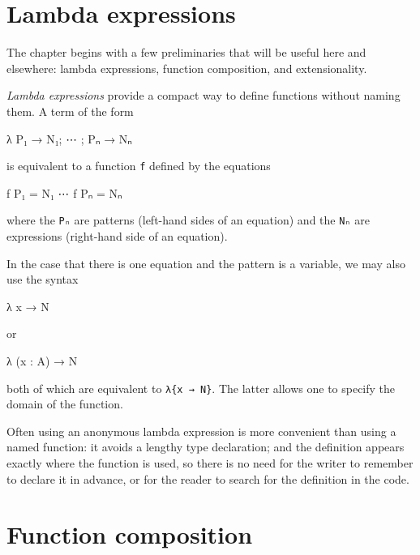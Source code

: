 \hypertarget{lambda-expressions}{%
\section{Lambda expressions}\label{lambda-expressions}}

The chapter begins with a few preliminaries that will be useful here and
elsewhere: lambda expressions, function composition, and extensionality.

\emph{Lambda expressions} provide a compact way to define functions
without naming them. A term of the form

\begin{myDisplay}
λ{ P₁ → N₁; ⋯ ; Pₙ → Nₙ }
\end{myDisplay}

is equivalent to a function \texttt{f} defined by the equations

\begin{myDisplay}
f P₁ = N₁
⋯
f Pₙ = Nₙ
\end{myDisplay}

where the \texttt{Pₙ} are patterns (left-hand sides of an equation) and
the \texttt{Nₙ} are expressions (right-hand side of an equation).

In the case that there is one equation and the pattern is a variable, we
may also use the syntax

\begin{myDisplay}
λ x → N
\end{myDisplay}

or

\begin{myDisplay}
λ (x : A) → N
\end{myDisplay}

both of which are equivalent to \texttt{λ\{x\ →\ N\}}. The latter allows
one to specify the domain of the function.

Often using an anonymous lambda expression is more convenient than using
a named function: it avoids a lengthy type declaration; and the
definition appears exactly where the function is used, so there is no
need for the writer to remember to declare it in advance, or for the
reader to search for the definition in the code.

\hypertarget{function-composition}{%
\section{Function composition}\label{function-composition}}

